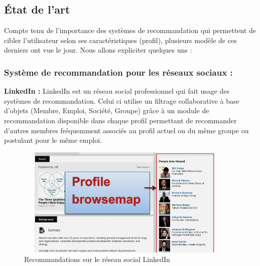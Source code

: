 \subsection{État de l'art}
Compte tenu de l'importance des systèmes de recommandation qui permettent de cibler l'utilisateur selon ses caractéristiques (profil), plusieurs modèle de ces derniers ont vue le jour. Nous allons expliciter quelques uns :

\subsubsection*{Système de recommandation pour les réseaux sociaux :}
\textbf{LinkedIn :} LinkedIn est un réseau social professionnel qui fait usage des systèmes de recommandation. Celui ci utilise un filtrage collaborative à base d'objets (Membre, Emploi, Société, Groupe) grâce à un module de recommandation disponible dans chaque profil permettant de recommander d'autres membres fréquemment associés au profil actuel ou du même groupe ou postulant pour le même emploi.\\
    \begin{figure}[H]
        \centering
            \includegraphics[height=150pt,width=300pt]{img/chapter1/linkedin.png}
        \caption{Recommandations sur le réseau social LinkedIn\cite{linkedin}}
    \end{figure}

